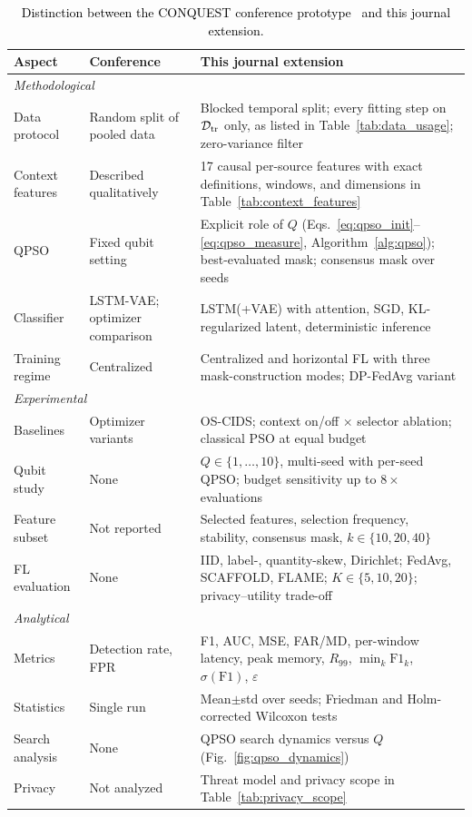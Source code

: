 \documentclass[conference]{IEEEtran}
\begin{document}
\begin{table}[!t]
\centering
\scriptsize
\caption{\textcolor{black}{Distinction between the CONQUEST conference prototype~\cite{ajakweconquest} and this journal extension.}}
\label{tab:conf_vs_journal}
\setlength{\tabcolsep}{3pt}
\renewcommand{\arraystretch}{1.10}
\begin{tabular}{p{1.5cm} p{2.4cm} p{3.9cm}}
\hline\toprule
\textbf{Aspect} & \textbf{Conference~\cite{ajakweconquest}} & \textbf{This journal extension} \\
\hline\toprule
\multicolumn{3}{l}{\textit{Methodological}} \\
Data protocol & Random split of pooled data & Blocked temporal split; every fitting step on $\mathcal{D}_{\rm tr}$ only, as listed in Table~\ref{tab:data_usage}; zero-variance filter \\
Context features & Described qualitatively & 17 causal per-source features with exact definitions, windows, and dimensions in Table~\ref{tab:context_features} \\
QPSO & Fixed qubit setting & Explicit role of $Q$ (Eqs.~\eqref{eq:qpso_init}--\eqref{eq:qpso_measure}, Algorithm~\ref{alg:qpso}); best-evaluated mask; consensus mask over seeds \\
Classifier & LSTM-VAE; optimizer comparison & LSTM(+VAE) with attention, SGD, KL-regularized latent, deterministic inference \\
Training regime & Centralized & Centralized and horizontal FL with three mask-construction modes; DP-FedAvg variant \\
\midrule
\multicolumn{3}{l}{\textit{Experimental}} \\
Baselines & Optimizer variants & OS-CIDS; context on/off $\times$ selector ablation; classical PSO at equal budget \\
Qubit study & None & $Q\in\{1,\dots,10\}$, multi-seed with per-seed QPSO; budget sensitivity up to $8\times$ evaluations \\
Feature subset & Not reported & Selected features, selection frequency, stability, consensus mask, $k\in\{10,20,40\}$ \\
FL evaluation & None & IID, label-, quantity-skew, Dirichlet; FedAvg, SCAFFOLD, FLAME; $K\in\{5,10,20\}$; privacy--utility trade-off \\
\midrule
\multicolumn{3}{l}{\textit{Analytical}} \\
Metrics & Detection rate, FPR & F1, AUC, MSE, FAR/MD, per-window latency, peak memory, $R_{99}$, $\min_k\mathrm{F1}_k$, $\sigma(\mathrm{F1})$, $\varepsilon$ \\
Statistics & Single run & Mean$\pm$std over seeds; Friedman and Holm-corrected Wilcoxon tests \\
Search analysis & None & QPSO search dynamics versus $Q$ (Fig.~\ref{fig:qpso_dynamics}) \\
Privacy & Not analyzed & Threat model and privacy scope in Table~\ref{tab:privacy_scope} \\
\hline\toprule
\end{tabular}
\end{table}
\end{document}
